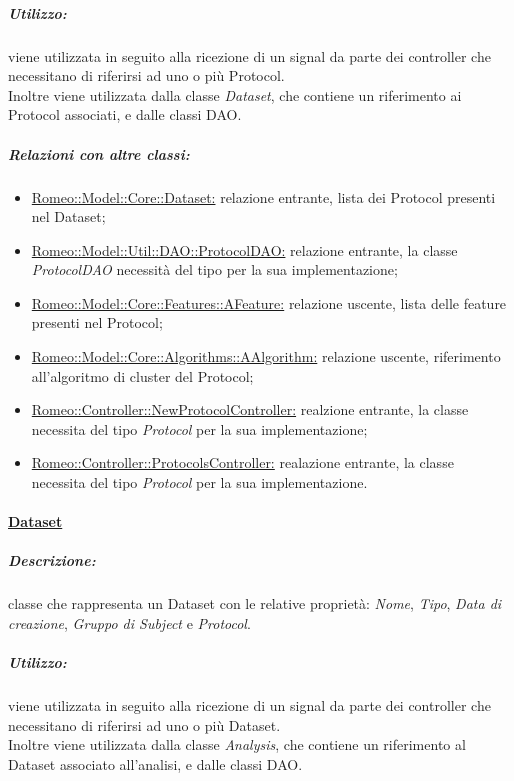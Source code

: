 			\subparagraph{Utilizzo:} viene utilizzata in seguito alla ricezione di un signal\g{} da
			parte dei controller che necessitano di riferirsi ad uno o più Protocol\g{}.
			\\Inoltre viene utilizzata dalla classe \textsl{Dataset}, che contiene un riferimento ai Protocol\g{} associati, e dalle classi DAO.
			
			\subparagraph{Relazioni con altre classi:}
				\begin{itemize}
					\item \hyperref[dataset]{Romeo::Model::Core::Dataset:} relazione entrante, lista dei Protocol\g{} presenti nel Dataset\g{};
					
					\item \hyperref[]{Romeo::Model::Util::DAO::ProtocolDAO:} relazione entrante, la classe \textsl{ProtocolDAO} necessità del tipo per la sua implementazione;
					
					\item \hyperref[features::features]{Romeo::Model::Core::Features::AFeature:} relazione uscente, lista delle feature\g{} presenti nel Protocol\g{};
					
					\item \hyperref[algorithms::algorithms]{Romeo::Model::Core::Algorithms::AAlgorithm:} relazione uscente, riferimento all'algoritmo di cluster\g{} del Protocol\g{};
					
					\item \hyperref[]{Romeo::Controller::NewProtocolController:} realzione entrante, la classe necessita del tipo \textsl{Protocol} per la sua implementazione;
					
					\item \hyperref[]{Romeo::Controller::ProtocolsController:} realazione entrante, la classe necessita del tipo \textsl{Protocol} per la sua implementazione.
				\end{itemize}
			
		\paragraph{\underline{Dataset}} 
		\label{dataset}
			
			\subparagraph{Descrizione:} classe che rappresenta un Dataset\g{} con le relative proprietà: \textit{Nome}, \textit{Tipo}, \textit{Data di creazione}, \textit{Gruppo di Subject\g{}} e \textit{Protocol\g{}}.

			\subparagraph{Utilizzo:} viene utilizzata in seguito alla ricezione di un signal\g{} da parte dei controller che necessitano di riferirsi ad uno o più Dataset\g{}.			
			\\Inoltre viene utilizzata dalla classe \textsl{Analysis}, che contiene un riferimento al Dataset\g{} associato all'analisi, e dalle classi DAO.
			
